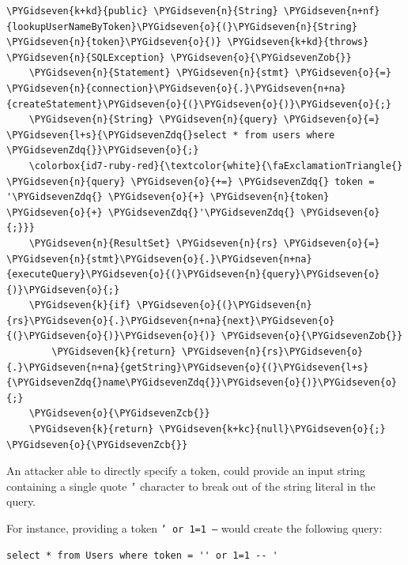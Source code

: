 \begin{mdframed}[backgroundcolor=lightgrey]
\begin{Verbatim}[commandchars=\\\{\}]
\PYGidseven{k+kd}{public} \PYGidseven{n}{String} \PYGidseven{n+nf}{lookupUserNameByToken}\PYGidseven{o}{(}\PYGidseven{n}{String} \PYGidseven{n}{token}\PYGidseven{o}{)} \PYGidseven{k+kd}{throws} \PYGidseven{n}{SQLException} \PYGidseven{o}{\PYGidsevenZob{}}
    \PYGidseven{n}{Statement} \PYGidseven{n}{stmt} \PYGidseven{o}{=} \PYGidseven{n}{connection}\PYGidseven{o}{.}\PYGidseven{n+na}{createStatement}\PYGidseven{o}{(}\PYGidseven{o}{)}\PYGidseven{o}{;}
    \PYGidseven{n}{String} \PYGidseven{n}{query} \PYGidseven{o}{=} \PYGidseven{l+s}{\PYGidsevenZdq{}select * from users where \PYGidsevenZdq{}}\PYGidseven{o}{;}
    \colorbox{id7-ruby-red}{\textcolor{white}{\faExclamationTriangle{} \PYGidseven{n}{query} \PYGidseven{o}{+=} \PYGidsevenZdq{} token = '\PYGidsevenZdq{} \PYGidseven{o}{+} \PYGidseven{n}{token} \PYGidseven{o}{+} \PYGidsevenZdq{}'\PYGidsevenZdq{} \PYGidseven{o}{;}}}
    \PYGidseven{n}{ResultSet} \PYGidseven{n}{rs} \PYGidseven{o}{=} \PYGidseven{n}{stmt}\PYGidseven{o}{.}\PYGidseven{n+na}{executeQuery}\PYGidseven{o}{(}\PYGidseven{n}{query}\PYGidseven{o}{)}\PYGidseven{o}{;}
    \PYGidseven{k}{if} \PYGidseven{o}{(}\PYGidseven{n}{rs}\PYGidseven{o}{.}\PYGidseven{n+na}{next}\PYGidseven{o}{(}\PYGidseven{o}{)}\PYGidseven{o}{)} \PYGidseven{o}{\PYGidsevenZob{}}
        \PYGidseven{k}{return} \PYGidseven{n}{rs}\PYGidseven{o}{.}\PYGidseven{n+na}{getString}\PYGidseven{o}{(}\PYGidseven{l+s}{\PYGidsevenZdq{}name\PYGidsevenZdq{}}\PYGidseven{o}{)}\PYGidseven{o}{;}
    \PYGidseven{o}{\PYGidsevenZcb{}}
    \PYGidseven{k}{return} \PYGidseven{k+kc}{null}\PYGidseven{o}{;}
\PYGidseven{o}{\PYGidsevenZcb{}}
\end{Verbatim}
\end{mdframed}

An attacker able to directly specify a token, could provide an input string containing a single quote \texttt{'}
character to break out of the string literal in the query.

For instance, providing a token \texttt{' or 1=1 --} would create the following query:

\begin{verbatim}
select * from Users where token = '' or 1=1 -- '
\end{verbatim}


